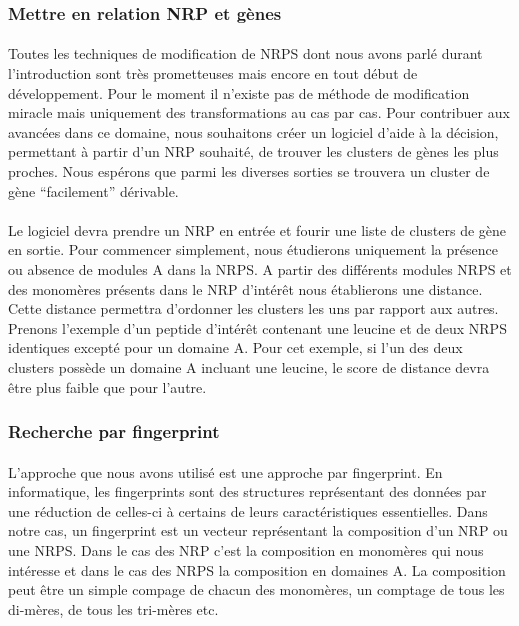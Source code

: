 \documentclass[12pt,french,twoside]{report}
\begin{document}
\subsubsection{Mettre en relation NRP et gènes}

\paragraph{}Toutes les techniques de modification de NRPS dont nous avons parlé durant l'introduction sont très prometteuses mais encore en tout début de développement.
Pour le moment il n'existe pas de méthode de modification miracle mais uniquement des transformations au cas par cas.
Pour contribuer aux avancées dans ce domaine, nous souhaitons créer un logiciel d'aide à la décision, permettant à partir d'un NRP souhaité, de trouver les clusters de gènes les plus proches.
Nous espérons que parmi les diverses sorties se trouvera un cluster de gène ``facilement'' dérivable.

\paragraph{}Le logiciel devra prendre un NRP en entrée et fourir une liste de clusters de gène en sortie.
Pour commencer simplement, nous étudierons uniquement la présence ou absence de modules A dans la NRPS.
A partir des différents modules NRPS et des monomères présents dans le NRP d'intérêt nous établierons une distance.
Cette distance permettra d'ordonner les clusters les uns par rapport aux autres.
Prenons l'exemple d'un peptide d'intérêt contenant une leucine et de deux NRPS identiques excepté pour un domaine A.
Pour cet exemple, si l'un des deux clusters possède un domaine A incluant une leucine, le score de distance devra être plus faible que pour l'autre.

\subsubsection{Recherche par fingerprint}

\paragraph{}L'approche que nous avons utilisé est une approche par fingerprint.
En informatique, les fingerprints sont des structures représentant des données par une réduction de celles-ci à certains de leurs caractéristiques essentielles.
Dans notre cas, un fingerprint est un vecteur représentant la composition d'un NRP ou une NRPS.
Dans le cas des NRP c'est la composition en monomères qui nous intéresse et dans le cas des NRPS la composition en domaines A.
La composition peut être un simple compage de chacun des monomères, un comptage de tous les di-mères, de tous les tri-mères etc.
\end{document}
